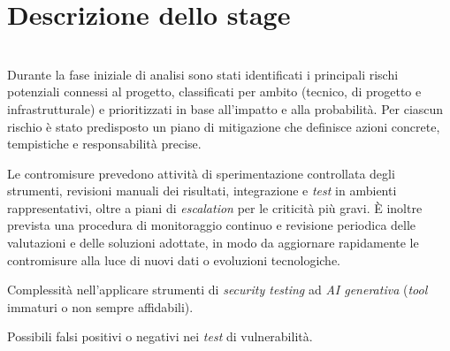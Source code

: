 \chapter{Descrizione dello stage}
\label{cap:descrizione-stage}
\\

Durante la fase iniziale di analisi sono stati identificati i principali rischi potenziali connessi al progetto, classificati per ambito (tecnico, di progetto e infrastrutturale) e prioritizzati in base all'impatto e alla probabilità. Per ciascun rischio è stato predisposto un piano di mitigazione che definisce azioni concrete, tempistiche e responsabilità precise.

Le contromisure prevedono attività di sperimentazione controllata degli strumenti, revisioni manuali dei risultati, integrazione e \emph{test} in ambienti rappresentativi, oltre a piani di \emph{escalation} per le criticità più gravi. È inoltre prevista una procedura di monitoraggio continuo e revisione periodica delle valutazioni e delle soluzioni adottate, in modo da aggiornare rapidamente le contromisure alla luce di nuovi dati o evoluzioni tecnologiche.\\

\begin{risk}{Complessità nell'applicare strumenti di \emph{security testing} ad \emph{AI generativa} (\emph{tool} immaturi o
non sempre affidabili).}
\end{risk}

\begin{risk}{Possibili falsi positivi o negativi nei \emph{test} di vulnerabilità.}
\end{risk}

